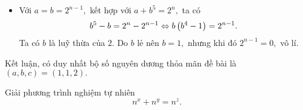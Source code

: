 \begin{gbtt}
{\begin{enumerate}
\begin{itemize}
        Lấy thương theo vế hai phương trình, ta được
        $$a^4-a^3+a^2-a+1=2^{m-n}.$$
        Vì $a$ là số lẻ  nên $a^4-a^3+a^2-a+1=2^{m-n}$ là số lẻ. Kéo theo $m=n.$ Từ đó ta được 
        $$a^5+1=a+1\Leftrightarrow a^5=a\Leftrightarrow a(a-1)(a+1)\tron{a^2+1}=0.$$
        Do $a>0$ nên $a=1.$ Thay $a=b=1$ vào phương trình đã cho, ta tìm được $c=2.$
        \item{} Với $a=b=2^{n-1},$ kết hợp với $a+b^5=2^n,$ ta có
        $$b^5-b=2^n-2^{n-1}\Leftrightarrow b\left(\displaystyle b^4-1 \right)=2^{n-1}.$$
        Ta có $b$ là luỹ thừa của $2.$ Do $b$ lẻ nên $b=1,$ nhưng khi đó $2^{n-1}=0,$ vô lí.
    \end{itemize}
\end{enumerate}
Kết luận, có duy nhất bộ số nguyên dương thỏa mãn đề bài là $(a,b,c)=(1,1,2).$}
\end{gbtt}


\begin{gbtt}
Giải phương trình nghiệm tự nhiên \[n^x+n^y=n^z.\]
\end{gbtt}

